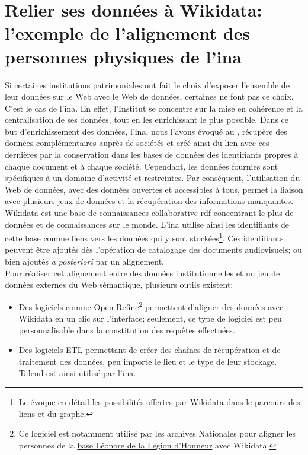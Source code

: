 \chapter{\label{II-C}Relier ses données à Wikidata: l'exemple de l'alignement des personnes physiques de l'\ac{ina}}

Si certaines institutions patrimoniales ont fait le choix d'exposer l'ensemble de leur données sur le Web avec le Web de données, certaines ne font pas ce choix. C'est le cas de l'\ac{ina}. En effet, l'Institut se concentre sur la mise en cohérence et la centralisation de ses données, tout en les enrichissant le plus possible. Dans ce but d'enrichissement des données, l'\ac{ina}, nous l'avons évoqué au , récupère des données complémentaires auprès de sociétés et créé ainsi du lien avec ces dernières par la conservation dans les bases de données des identifiants propres à chaque document et à chaque société. Cependant, les données fournies sont spécifiques à un domaine d'activité et restreintes. Par conséquent, l'utilisation du Web de données, avec des données ouvertes et accessibles à tous, permet la liaison avec plusieurs jeux de données et la récupération des informations manquantes.\\

\href{https://www.wikidata.org/}{Wikidata} est une base de connaissances collaborative \ac{rdf} concentrant le plus de données et de connaissances sur le monde. L'\ac{ina} utilise ainsi les identifiants de cette base comme liens vers les données qui y sont stockées\footnote{Le  évoque en détail les possibilités offertes par Wikidata dans le parcours des liens et du graphe.}. Ces identifiants peuvent être ajoutés dès l'opération de catalogage des documents audiovisuels; ou bien ajoutés \textit{a posteriori} par un alignement.\\

Pour réaliser cet alignement entre des données institutionnelles et un jeu de données externes du Web sémantique, plusieurs outils existent:
\begin{itemize}
	\item Des logiciels comme \href{https://openrefine.org/}{Open Refine}\footnote{Ce logiciel est notamment utilisé par les archives Nationales pour aligner les personnes de la \href{http://www2.culture.gouv.fr/documentation/leonore/}{base Léonore de la Légion d'Honneur} avec Wikidata.} permettent d'aligner des données avec Wikidata en un clic sur l'interface; seulement, ce type de logiciel est peu personnalisable dans la constitution des requêtes effectuées.
	\item Des logiciels ETL permettant de créer des chaînes de récupération et de traitement des données, peu importe le lieu et le type de leur stockage. \href{https://www.talend.com/fr/}{Talend} est ainsi utilisé par l'\ac{ina}.
\end{itemize}
\medskip


